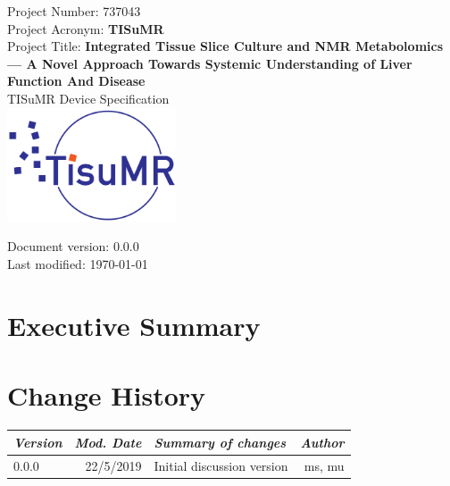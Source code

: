 \documentclass{EU-report}
\begin{document}
\begin{center}
\vfill
Project Number: 737043\\[1cm]
Project Acronym: \textbf{TISuMR}\\[1cm]
Project Title: \textbf{Integrated Tissue Slice Culture and NMR Metabolomics
  --- A Novel Approach Towards Systemic Understanding of Liver Function And Disease}\\
\vfill
{\Huge TISuMR Device Specification\\}
\vfill
\includegraphics[width=5cm]{tisumr-logo-small}
\end{center}
\vfill
Document version: 0.0.0 \\
Last modified: \today
\vspace{1cm}

\clearpage
\section{Executive Summary}

\section{Change History}
\begin{center}
	\begin{tabular}{lrp{7cm}r} \hline\hline
		\emph{Version} & \emph{Mod. Date} & \emph{Summary of changes} & \emph{Author} \\
		\hline
		0.0.0 & 22/5/2019 & Initial discussion version & ms, mu\\
		\hline\hline
	\end{tabular}
\end{center}
\clearpage


\end{document}
